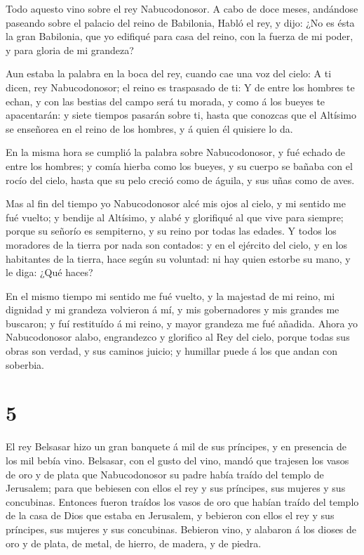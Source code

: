  Todo aquesto vino sobre el rey Nabucodonosor.
 A cabo de doce meses, andándose paseando sobre el palacio
del reino de Babilonia,  Habló el rey, y dijo: ¿No es ésta
la gran Babilonia, que yo edifiqué para casa del reino, con la fuerza de
mi poder, y para gloria de mi grandeza?

 Aun estaba la palabra en la boca del rey, cuando cae una
voz del cielo: A ti dicen, rey Nabucodonosor; el reino es traspasado de
ti:  Y de entre los hombres te echan, y con las bestias del
campo será tu morada, y como á los bueyes te apacentarán: y siete
tiempos pasarán sobre ti, hasta que conozcas que el Altísimo se
enseñorea en el reino de los hombres, y á quien él quisiere lo da.

 En la misma hora se cumplió la palabra sobre
Nabucodonosor, y fué echado de entre los hombres; y comía hierba como
los bueyes, y su cuerpo se bañaba con el rocío del cielo, hasta que su
pelo creció como de águila, y sus uñas como de aves.

 Mas al fin del tiempo yo Nabucodonosor alcé mis ojos al
cielo, y mi sentido me fué vuelto; y bendije al Altísimo, y alabé y
glorifiqué al que vive para siempre; porque su señorío es sempiterno, y
su reino por todas las edades.  Y todos los moradores de la
tierra por nada son contados: y en el ejército del cielo, y en los
habitantes de la tierra, hace según su voluntad: ni hay quien estorbe su
mano, y le diga: ¿Qué haces?

 En el mismo tiempo mi sentido me fué vuelto, y la majestad
de mi reino, mi dignidad y mi grandeza volvieron á mí, y mis
gobernadores y mis grandes me buscaron; y fuí restituído á mi reino, y
mayor grandeza me fué añadida.  Ahora yo Nabucodonosor
alabo, engrandezco y glorifico al Rey del cielo, porque todas sus obras
son verdad, y sus caminos juicio; y humillar puede á los que andan con
soberbia.

\hypertarget{section-4}{%
\section{5}\label{section-4}}

 El rey Belsasar hizo un gran banquete á mil de sus
príncipes, y en presencia de los mil bebía vino.  Belsasar,
con el gusto del vino, mandó que trajesen los vasos de oro y de plata
que Nabucodonosor su padre había traído del templo de Jerusalem; para
que bebiesen con ellos el rey y sus príncipes, sus mujeres y sus
concubinas.  Entonces fueron traídos los vasos de oro que
habían traído del templo de la casa de Dios que estaba en Jerusalem, y
bebieron con ellos el rey y sus príncipes, sus mujeres y sus concubinas.
 Bebieron vino, y alabaron á los dioses de oro y de plata,
de metal, de hierro, de madera, y de piedra.

